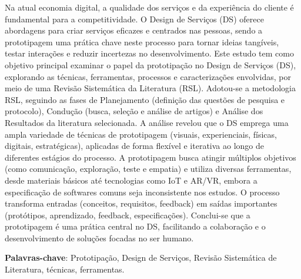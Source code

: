 \begin{resumo}


Na atual economia digital, a qualidade dos serviços e da experiência do cliente é fundamental para a competitividade. O Design de Serviços (DS) oferece abordagens para criar serviços eficazes e centrados nas pessoas, sendo a prototipagem uma prática chave neste processo para tornar ideias tangíveis, testar interações e reduzir incertezas no desenvolvimento.
Este estudo tem como objetivo principal examinar o papel da prototipação no Design de Serviços (DS), explorando as técnicas, ferramentas, processos e caracterizações envolvidas, por meio de uma Revisão Sistemática da Literatura (RSL).
Adotou-se a metodologia RSL, seguindo as fases de Planejamento (definição das questões de pesquisa e protocolo), Condução (busca, seleção e análise de artigos) e Análise dos Resultados da literatura selecionada.
A análise revelou que o DS emprega uma ampla variedade de técnicas de prototipagem (visuais, experienciais, físicas, digitais, estratégicas), aplicadas de forma flexível e iterativa ao longo de diferentes estágios do processo. A prototipagem busca atingir múltiplos objetivos (como comunicação, exploração, teste e empatia) e utiliza diversas ferramentas, desde materiais básicos até tecnologias como IoT e AR/VR, embora a especificação de softwares comuns seja inconsistente nos estudos. O processo transforma entradas (conceitos, requisitos, feedback) em saídas importantes (protótipos, aprendizado, feedback, especificações).
Conclui-se que a prototipagem é uma prática central no DS, facilitando a colaboração e o desenvolvimento de soluções focadas no ser humano.


 \vspace{\onelineskip}
	
 \noindent
 \textbf{Palavras-chave}: Prototipação, Design de Serviços, Revisão Sistemática de Literatura, técnicas, ferramentas.
\end{resumo}

